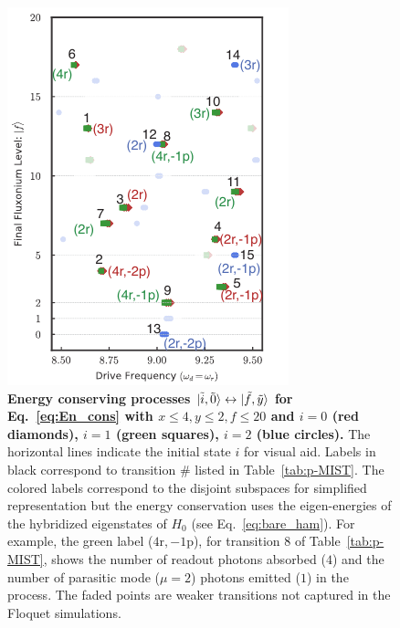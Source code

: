 \documentclass[%
reprint,
superscriptaddress,
 amsmath,amssymb,
 aps,
 prx,
longbibliography,
floatfix,
]{revtex4-2}
\begin{document}
\begin{figure}[t]
    \centering
    \includegraphics[width=\linewidth]{Figures/Trans_.pdf}
    \caption{{\bf Energy conserving processes $\ket{\tilde{i},\tilde{0}}\leftrightarrow\ket{\tilde{f},\tilde{y}}$ for Eq.~\ref{eq:En_cons} with $x\le 4, y\le 2, f\le 20$ and $i=0$ (red diamonds), $i=1$ (green squares), $i=2$ (blue circles).} The horizontal lines indicate the initial state $i$ for visual aid. Labels in black correspond to transition $\#$ listed in Table~\ref{tab:p-MIST}. The colored labels correspond to the disjoint subspaces for simplified representation but the energy conservation uses the eigen-energies of the hybridized eigenstates of $H_{0}$ (see Eq.~\ref{eq:bare_ham}). For example, the green label ($4 \mathrm{r},-1 \mathrm{p}$), for transition $8$ of Table~\ref{tab:p-MIST}, shows the number of readout photons absorbed ($4$) and the number of parasitic mode ($\mu=2$) photons emitted ($1$) in the process. The faded points are weaker transitions not captured in the Floquet simulations. 
}
    \label{fig:trans_prof}
\end{figure}
\end{document}
